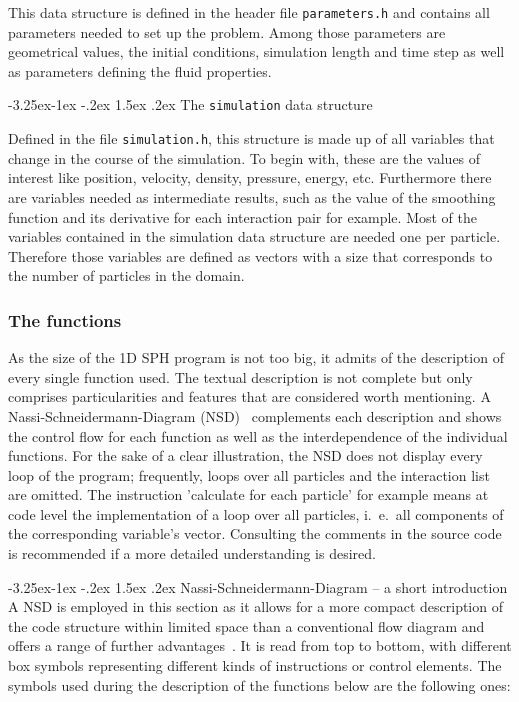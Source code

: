 \documentclass{report}
\makeatletter
\renewcommand\paragraph{\@startsection{paragraph}{4}{\z@}%
  {-3.25ex\@plus -1ex \@minus -.2ex}%
  {1.5ex \@plus .2ex}%
  {\normalfont\normalsize\bfseries}}
\makeatother
\begin{document}
This data structure is defined in the header file {\tt parameters.h} and 
contains all parameters needed to set up the problem. Among those parameters are 
geometrical values, the initial conditions, simulation length and time step 
as well as parameters defining the fluid properties.

\paragraph{The {\tt simulation} data structure}

Defined in the file {\tt simulation.h}, this structure is made up of all 
variables that change in the course of the simulation. To begin with, these are the values of interest like position, velocity, density, pressure, energy, etc. Furthermore there are variables needed as intermediate results, such as the value of the smoothing function and its derivative for each interaction pair for example. 
Most of the variables contained in the simulation data structure are needed one per particle. Therefore those variables are defined as vectors with a size that corresponds to the number of particles in the domain. 

\subsubsection{The functions}

As the size of the 1D SPH program is not too big, it admits of the description of every single function used. The textual description is not complete but only comprises particularities and features that are considered worth mentioning. A Nassi-Schneidermann-Diagram (NSD)~\cite{Nassi1973} complements each description and shows the control flow for each function as well as the interdependence of the individual functions. For the sake of a clear illustration, the NSD does not display every loop of the program; frequently, loops over all particles and the interaction list are omitted. The instruction 'calculate for each particle' for example means at code level the implementation of a loop over all particles, i.\ e.\, all components of the corresponding variable's vector.  Consulting the comments in the source code is recommended if a more detailed understanding is desired.

\paragraph{Nassi-Schneidermann-Diagram -- a short introduction}
A NSD is employed in this section as it allows for a more compact description of the code structure within limited space than a conventional flow diagram and offers a range of further advantages~\cite{Nassi1973}. It is read from top to bottom, with different box symbols representing different kinds of instructions or control elements. The symbols used during the description of the functions below are the following ones:
\end{document}
